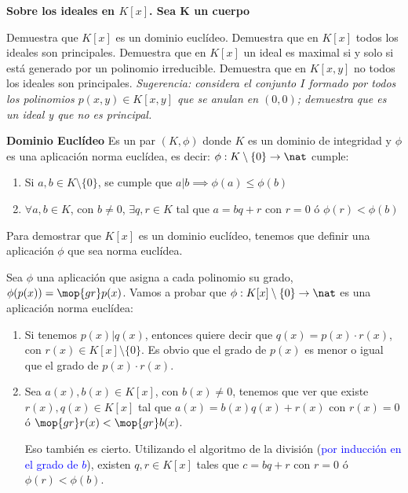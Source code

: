 \begin{problem}
{\bfseries Sobre los ideales en $K[x]$. Sea K un cuerpo}

\ppart Demuestra que $K[x]$ es un dominio euclídeo.
\ppart Demuestra que en $K[x]$ todos los ideales son principales.
\ppart Demuestra que en $K[x]$ un ideal es maximal si y solo si está generado por un polinomio irreducible.
\ppart Demuestra que en $K[x,y]$ no todos los ideales son principales. {\em Sugerencia: considera el conjunto $I$ formado por todos los polinomios $p(x,y)\in K[x,y]$ que se anulan en $(0,0)$; demuestra que es un ideal y que no es principal.}

\solution


\begin{defn} \textbf{Dominio Euclídeo}
	Es un par $(K, \phi)$ donde $K$ es un dominio de integridad y $\phi$ es una aplicación norma euclídea, es decir: $\phi: K \setminus \{0\} \rightarrow \nat$ cumple:
	\begin{enumerate}
		\item Si $a,b \in K \setminus \{0\}$, se cumple que $a | b \implies \phi(a) \leq \phi(b)$
		\item $\forall a,b \in K$, con $b \neq 0$, $\exists q,r \in K$ tal que $a=bq+r$ con $r=0$ ó $\phi(r) < \phi(b)$
	\end{enumerate}
\end{defn}

Para demostrar que $K[x]$ es un dominio euclídeo, tenemos que definir una aplicación $\phi$ que sea norma euclídea.

Sea $\phi$ una aplicación que asigna a cada polinomio su grado, $\phi(p(x)) = \mop{gr} p(x)$. Vamos a probar que $\phi: K[x] \setminus \{0\} \rightarrow \nat$ es una aplicación norma euclídea:
\begin{enumerate}
	\item Si tenemos $p(x) | q(x)$, entonces quiere decir que $q(x)=p(x)\cdot r(x)$, con $r(x) \in K[x] \setminus \{0\}$. Es obvio que el grado de $p(x)$ es menor o igual que el grado de $p(x)\cdot r(x)$.
	\item Sea $a(x), b(x) \in K[x]$, con $b(x) \neq 0$, tenemos que ver que existe $r(x), q(x) \in K[x]$ tal que $a(x)=b(x)q(x)+r(x)$ con $r(x)=0$ ó $\mop{gr} r(x) < \mop{gr} b(x)$.

	Eso también es cierto. Utilizando el algoritmo de la división (\textcolor{blue}{por inducción en el grado de $b$}), existen $q,r \in K[x]$ tales que $c=bq+r$ con $r=0$ ó $\phi(r) < \phi(b)$.
\end{enumerate}


\end{problem}

